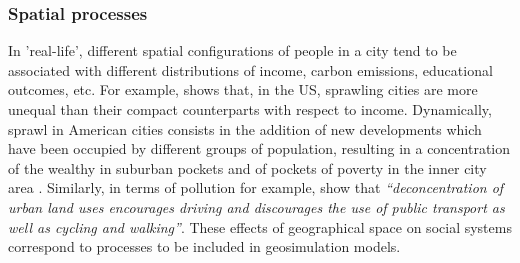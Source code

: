 \documentclass{JASSS}
\begin{document}
\subsubsection{Spatial processes}
In 'real-life', different spatial configurations of people in a city tend to be associated with different distributions of income, carbon emissions, educational outcomes, etc. For example, \citet{wheeler2006urban} shows that, in the US, sprawling cities are more unequal than their compact counterparts with respect to income. Dynamically, sprawl in American cities consists in the addition of new developments which have been occupied by different groups of population, resulting in a concentration of the wealthy in suburban pockets and of pockets of poverty in the inner city area \citep{jargowsky2002sprawl}. Similarly, in terms of pollution for example, \citet[p.173]{schwanen2001travel} show that \textit{``deconcentration of urban land uses encourages driving and discourages the use of public transport as well as cycling and walking''}. These effects of geographical space on social systems correspond to processes to be included in geosimulation models.\\
\end{document}
